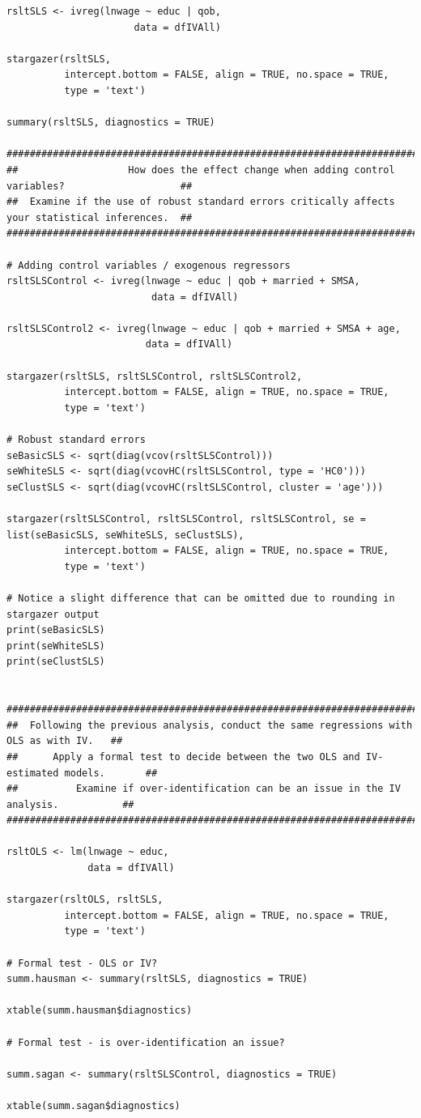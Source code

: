 \documentclass{article}
\begin{document}
\begin{tiny}
\begin{verbatim}
rsltSLS <- ivreg(lnwage ~ educ | qob,
                      data = dfIVAll)

stargazer(rsltSLS, 
          intercept.bottom = FALSE, align = TRUE, no.space = TRUE,
          type = 'text')

summary(rsltSLS, diagnostics = TRUE)

####################################################################################################
##                   How does the effect change when adding control variables?                    ##
##  Examine if the use of robust standard errors critically affects your statistical inferences.  ##
####################################################################################################

# Adding control variables / exogenous regressors 
rsltSLSControl <- ivreg(lnwage ~ educ | qob + married + SMSA,
                         data = dfIVAll)

rsltSLSControl2 <- ivreg(lnwage ~ educ | qob + married + SMSA + age,
                        data = dfIVAll)

stargazer(rsltSLS, rsltSLSControl, rsltSLSControl2,
          intercept.bottom = FALSE, align = TRUE, no.space = TRUE,
          type = 'text')

# Robust standard errors
seBasicSLS <- sqrt(diag(vcov(rsltSLSControl)))
seWhiteSLS <- sqrt(diag(vcovHC(rsltSLSControl, type = 'HC0')))
seClustSLS <- sqrt(diag(vcovHC(rsltSLSControl, cluster = 'age')))

stargazer(rsltSLSControl, rsltSLSControl, rsltSLSControl, se = list(seBasicSLS, seWhiteSLS, seClustSLS),
          intercept.bottom = FALSE, align = TRUE, no.space = TRUE, 
          type = 'text')

# Notice a slight difference that can be omitted due to rounding in stargazer output
print(seBasicSLS)
print(seWhiteSLS)
print(seClustSLS)


###########################################################################################
##  Following the previous analysis, conduct the same regressions with OLS as with IV.   ##
##      Apply a formal test to decide between the two OLS and IV-estimated models.       ##
##          Examine if over-identification can be an issue in the IV analysis.           ##
###########################################################################################

rsltOLS <- lm(lnwage ~ educ,
              data = dfIVAll)

stargazer(rsltOLS, rsltSLS, 
          intercept.bottom = FALSE, align = TRUE, no.space = TRUE,
          type = 'text')

# Formal test - OLS or IV? 
summ.hausman <- summary(rsltSLS, diagnostics = TRUE)

xtable(summ.hausman$diagnostics)

# Formal test - is over-identification an issue? 

summ.sagan <- summary(rsltSLSControl, diagnostics = TRUE)

xtable(summ.sagan$diagnostics)


\end{verbatim}
\end{tiny}
\end{document}
